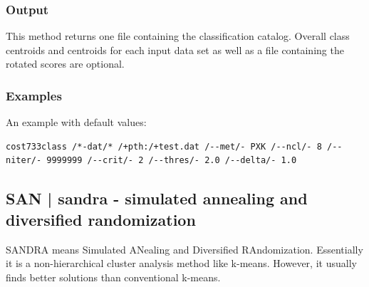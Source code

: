 \documentclass[12pt, oneside, a4paper, headsepline, plainheadsepline]{scrbook}
\begin{document}
\subsubsection*{Output}
This method returns one file containing the classification catalog. 
Overall class centroids and centroids for each input data set as well as a file containing the rotated scores are optional.

\subsubsection*{Examples}
An example with default values:
\begin{lstlisting}
cost733class /*-dat/* /+pth:/+test.dat /--met/- PXK /--ncl/- 8 /--niter/- 9999999 /--crit/- 2 /--thres/- 2.0 /--delta/- 1.0
\end{lstlisting}
\subsection{SAN | sandra - simulated annealing and diversified randomization}
SANDRA means Simulated ANealing and Diversified RAndomization. Essentially it is a non-hierarchical cluster
analysis method like k-means. However, it usually finds better solutions than conventional k-means. 
\end{document}
